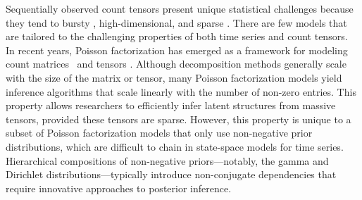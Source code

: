 \documentclass{article}
\begin{document}
%
Sequentially observed count tensors present unique statistical challenges because they tend to bursty \cite{kleinberg2003bursty}, high-dimensional, and sparse \cite{chi2012tensors,kunihama2013bayesian}. There are few models that are tailored to the challenging properties of both time series and count tensors.~
In recent years, Poisson factorization has emerged as a framework for modeling count matrices~\cite{canny2004gap,Dunson2005bayesianlatent,titsias2008infinite,cemgil2009bayesian,zhou2011beta,gopalan2013efficient} and tensors \cite{chi2012tensors,ermis2014bayesian,schein2015bayesian}. Although decomposition methods generally scale with the size of the matrix or tensor, many Poisson factorization models yield inference algorithms that scale linearly with the number of non-zero entries. This property allows researchers to efficiently infer latent structures from massive tensors, provided these tensors are sparse. However, this property is unique to a subset of Poisson factorization models that only use non-negative prior distributions, which are difficult to chain in state-space models for time series. Hierarchical compositions of non-negative priors---notably, the gamma and Dirichlet distributions---typically introduce non-conjugate dependencies that require innovative approaches to posterior inference.

\end{document}
